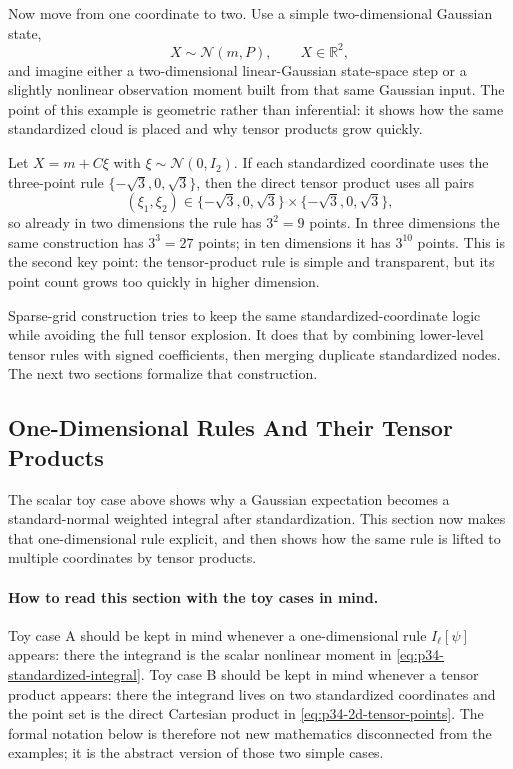 \documentclass[11pt]{article}
\numberwithin{equation}{section}
\newcommand{\R}{\mathbb R}
\newcommand{\N}{\mathcal N}
\begin{document}
Now move from one coordinate to two.  Use a simple two-dimensional Gaussian
state,
\begin{equation}
  X\sim\N(m,P),
  \qquad
  X\in\R^2,
  \label{eq:p34-2d-gaussian}
\end{equation}
and imagine either a two-dimensional linear-Gaussian state-space step or a
slightly nonlinear observation moment built from that same Gaussian input.  The
point of this example is geometric rather than inferential: it shows how the
same standardized cloud is placed and why tensor products grow quickly.

Let \(X=m+C\xi\) with \(\xi\sim\N(0,I_2)\).  If each standardized coordinate
uses the three-point rule \(\{-\sqrt3,0,\sqrt3\}\), then the direct tensor
product uses all pairs
\begin{equation}
  (\xi_1,\xi_2)
  \in
  \{-\sqrt3,0,\sqrt3\}\times\{-\sqrt3,0,\sqrt3\},
  \label{eq:p34-2d-tensor-points}
\end{equation}
so already in two dimensions the rule has \(3^2=9\) points.  In three
dimensions the same construction has \(3^3=27\) points; in ten dimensions it
has \(3^{10}\) points.  This is the second key point: the tensor-product rule is
simple and transparent, but its point count grows too quickly in higher
dimension.

Sparse-grid construction tries to keep the same standardized-coordinate logic
while avoiding the full tensor explosion.  It does that by combining lower-level
tensor rules with signed coefficients, then merging duplicate standardized
nodes.  The next two sections formalize that construction.

\subsection{One-Dimensional Rules And Their Tensor Products}
\label{sec:p31-ghq}

The scalar toy case above shows why a Gaussian expectation becomes a
standard-normal weighted integral after standardization.  This section now makes
that one-dimensional rule explicit, and then shows how the same rule is lifted to
multiple coordinates by tensor products.

\paragraph{How to read this section with the toy cases in mind.}
Toy case A should be kept in mind whenever a one-dimensional rule
\(I_\ell[\psi]\) appears: there the integrand is the scalar nonlinear moment in
\eqref{eq:p34-standardized-integral}.  Toy case B should be kept in mind whenever
a tensor product appears: there the integrand lives on two standardized
coordinates and the point set is the direct Cartesian product in
\eqref{eq:p34-2d-tensor-points}.  The formal notation below is therefore not new
mathematics disconnected from the examples; it is the abstract version of those
two simple cases.
\end{document}
